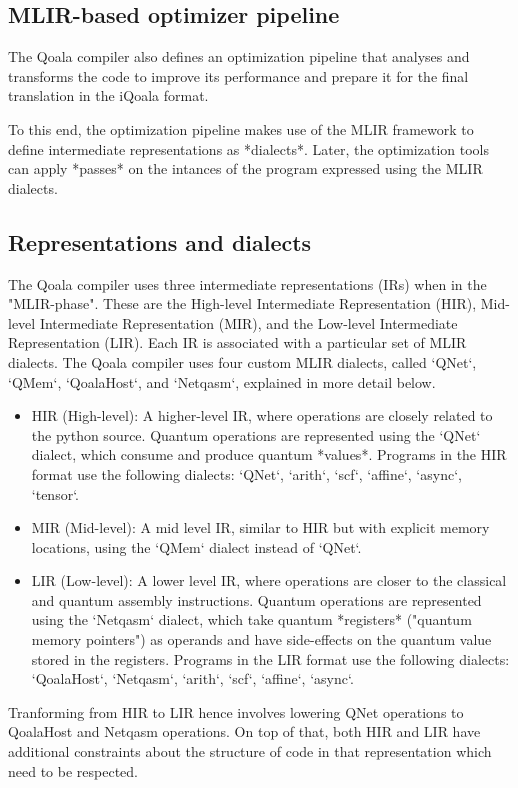 \subsection{MLIR-based optimizer pipeline}
The Qoala compiler also defines an optimization pipeline that analyses and
transforms the code to improve its performance and prepare it for the final
translation in the iQoala format.

To this end, the optimization pipeline makes use of the MLIR framework to
define intermediate representations as *dialects*. Later, the optimization
tools can apply *passes* on the intances of the program expressed using the
MLIR dialects.


\subsection{Representations and dialects}
The Qoala compiler uses three intermediate representations (IRs) when in the "MLIR-phase".
These are the High-level Intermediate Representation (HIR), Mid-level Intermediate Representation (MIR), and the Low-level Intermediate Representation (LIR).
Each IR is associated with a particular set of MLIR dialects.
The Qoala compiler uses four custom MLIR dialects, called `QNet`, `QMem`, `QoalaHost`, and `Netqasm`, explained in more detail below.

\begin{itemize}
\item HIR (High-level): A higher-level IR, where operations are closely related
  to the python source.
  Quantum operations are represented using the `QNet` dialect, which consume and produce quantum *values*.
  Programs in the HIR format use the following dialects: `QNet`, `arith`, `scf`, `affine`, `async`, `tensor`.
\item MIR (Mid-level): A mid level IR, similar to HIR but with explicit memory locations, using the `QMem` dialect instead of `QNet`.
\item LIR (Low-level): A lower level IR, where operations are closer to the
  classical and quantum assembly instructions.
  Quantum operations are represented using the `Netqasm` dialect, which take quantum *registers* ("quantum memory pointers") as operands
  and have side-effects on the quantum value stored in the registers.
  Programs in the LIR format use the following dialects: `QoalaHost`, `Netqasm`, `arith`, `scf`, `affine`, `async`.
\end{itemize}

Tranforming from HIR to LIR hence involves lowering QNet operations to QoalaHost and Netqasm operations.
On top of that, both HIR and LIR have additional constraints about the structure of code in that representation which need to be respected.


